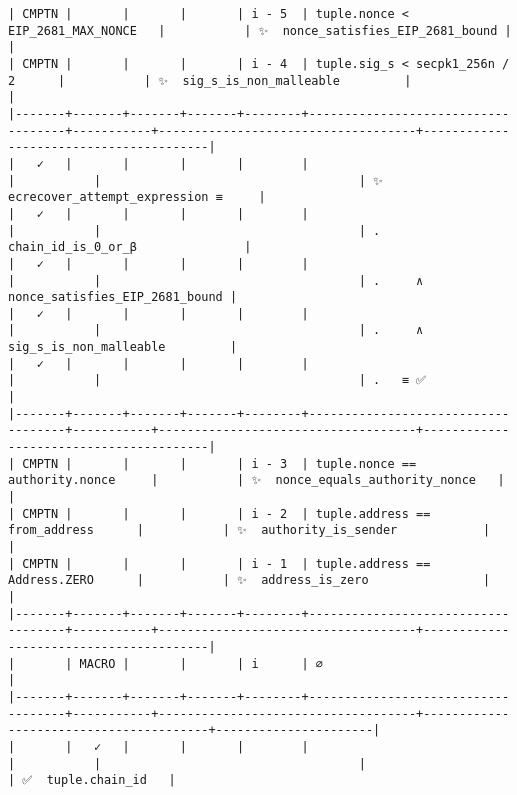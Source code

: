 \documentclass[varwidth=\maxdimen,margin=0.5cm,multi={verbatim}]{standalone}
\begin{document}
\begin{verbatim}
| CMPTN |       |       |       | i - 5  | tuple.nonce < EIP_2681_MAX_NONCE   |           | ✨  nonce_satisfies_EIP_2681_bound |                                        |
| CMPTN |       |       |       | i - 4  | tuple.sig_s < secpk1_256n / 2      |           | ✨  sig_s_is_non_malleable         |                                        |
|-------+-------+-------+-------+--------+------------------------------------+-----------+------------------------------------+----------------------------------------|
|   ✓   |       |       |       |        |                                    |           |                                    | ✨  ecrecover_attempt_expression ≡     |
|   ✓   |       |       |       |        |                                    |           |                                    | .     chain_id_is_0_or_β               |
|   ✓   |       |       |       |        |                                    |           |                                    | .     ∧ nonce_satisfies_EIP_2681_bound |
|   ✓   |       |       |       |        |                                    |           |                                    | .     ∧ sig_s_is_non_malleable         |
|   ✓   |       |       |       |        |                                    |           |                                    | .   ≡ ✅                               |
|-------+-------+-------+-------+--------+------------------------------------+-----------+------------------------------------+----------------------------------------|
| CMPTN |       |       |       | i - 3  | tuple.nonce == authority.nonce     |           | ✨  nonce_equals_authority_nonce   |                                        |
| CMPTN |       |       |       | i - 2  | tuple.address == from_address      |           | ✨  authority_is_sender            |                                        |
| CMPTN |       |       |       | i - 1  | tuple.address == Address.ZERO      |           | ✨  address_is_zero                |                                        |
|-------+-------+-------+-------+--------+------------------------------------+-----------+------------------------------------+----------------------------------------|
|       | MACRO |       |       | i      | ∅                                  |
|-------+-------+-------+-------+--------+------------------------------------+-----------+------------------------------------+----------------------------------------+----------------------|
|       |   ✓   |       |       |        |                                    |           |                                    |                                        | ✅  tuple.chain_id   |

\end{verbatim}
\end{document}
